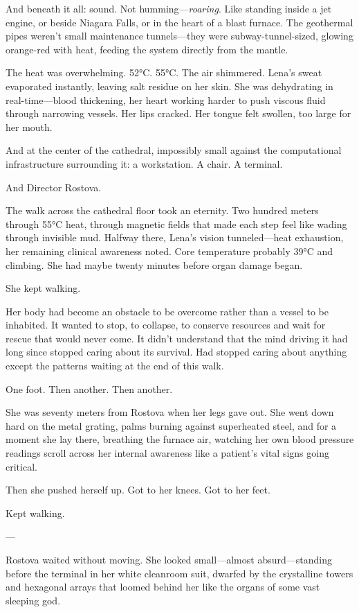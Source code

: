 And beneath it all: sound. Not humming—\textit{roaring}. Like standing inside a jet engine, or beside Niagara Falls, or in the heart of a blast furnace. The geothermal pipes weren't small maintenance tunnels—they were subway-tunnel-sized, glowing orange-red with heat, feeding the system directly from the mantle.

The heat was overwhelming. 52°C. 55°C. The air shimmered. Lena's sweat evaporated instantly, leaving salt residue on her skin. She was dehydrating in real-time—blood thickening, her heart working harder to push viscous fluid through narrowing vessels. Her lips cracked. Her tongue felt swollen, too large for her mouth.

And at the center of the cathedral, impossibly small against the computational infrastructure surrounding it: a workstation. A chair. A terminal.

And Director Rostova.

The walk across the cathedral floor took an eternity. Two hundred meters through 55°C heat, through magnetic fields that made each step feel like wading through invisible mud. Halfway there, Lena's vision tunneled—heat exhaustion, her remaining clinical awareness noted. Core temperature probably 39°C and climbing. She had maybe twenty minutes before organ damage began.

She kept walking.

Her body had become an obstacle to be overcome rather than a vessel to be inhabited. It wanted to stop, to collapse, to conserve resources and wait for rescue that would never come. It didn't understand that the mind driving it had long since stopped caring about its survival. Had stopped caring about anything except the patterns waiting at the end of this walk.

One foot. Then another. Then another.

She was seventy meters from Rostova when her legs gave out. She went down hard on the metal grating, palms burning against superheated steel, and for a moment she lay there, breathing the furnace air, watching her own blood pressure readings scroll across her internal awareness like a patient's vital signs going critical.

Then she pushed herself up. Got to her knees. Got to her feet.

Kept walking.

---

Rostova waited without moving. She looked small—almost absurd—standing before the terminal in her white cleanroom suit, dwarfed by the crystalline towers and hexagonal arrays that loomed behind her like the organs of some vast sleeping god.

